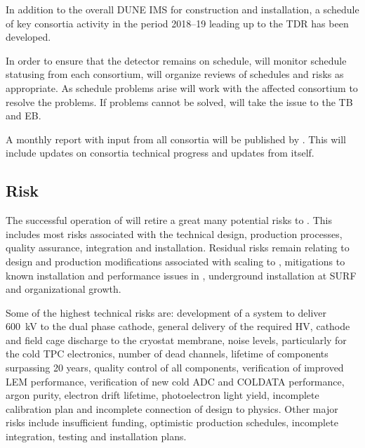 In addition to the overall DUNE IMS for construction and
installation, a schedule of key consortia activity in the period
2018--19 leading up to the TDR has been developed.

In order to ensure that the  detector remains on schedule,
 will monitor schedule statusing from each consortium, will organize
reviews of schedules and risks as appropriate.  As schedule problems
arise  will work with the affected consortium to resolve the
problems. If problems cannot be solved,  will take the issue to the
TB and EB.

A monthly report with input from all consortia will be published by
. This will include updates on consortia technical progress and
updates from  itself.


\subsection{Risk}
\label{sec:fdsp-coord-risk}

The successful operation of  will retire a great many
potential risks to . This includes most risks associated with the
technical design, production processes, quality assurance, integration
and installation. Residual risks remain relating to design and
production modifications associated with scaling to , mitigations
to known installation and performance issues in , underground
installation at SURF and organizational growth.

Some of the highest technical risks are: development of a system to
deliver 600~kV to the dual phase cathode, general delivery of the
required HV, cathode and field cage discharge to the cryostat
membrane, noise levels, particularly for the cold TPC electronics,
number of dead channels, lifetime of components surpassing 20 years,
quality control of all components, verification of improved LEM
performance, verification of new cold ADC and COLDATA performance,
argon purity, electron drift lifetime, photoelectron light yield,
incomplete calibration plan and incomplete connection of design to
physics. Other major risks include insufficient funding, optimistic
production schedules, incomplete integration, testing and installation
plans.

